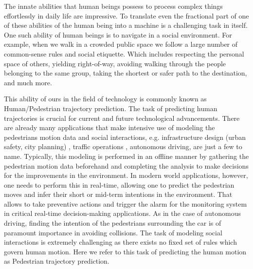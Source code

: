 The innate abilities that human beings possess to process complex things effortlessly in daily life are impressive. To translate even the fractional part of one of these abilities of the human being into a machine is a challenging task in itself. One such ability of human beings is to navigate in a social environment. For example, when we walk in a crowded public space we follow a large number of common-sense rules and social etiquette. Which includes respecting the personal space of others, yielding right-of-way, avoiding walking through the people belonging to the same group, taking the shortest or safer path to the destination, and much more.

This ability of ours in the field of technology is commonly known as Human/Pedestrian trajectory prediction. The task of predicting human trajectories is crucial for current and future technological advancements. There are already many applications that make intensive use of modeling the pedestrians motion data and social interactions, e.g. infrastructure design (urban safety, city planning) \cite{Hanisch2003OnlineSO, Lerner2007CrowdsBE, Bitgood2006AnAO}, traffic operations \cite{Horni2016TheMT}, autonomous driving, are just a few to name. Typically, this modeling is performed in an offline manner by gathering the pedestrian motion data beforehand and completing the analysis to make decisions for the improvements in the environment. In modern world applications, however, one needs to perform this in real-time, allowing one to predict the pedestrian moves and infer their short or mid-term intentions in the environment. That allows to take preventive actions and trigger the alarm for the monitoring system in critical real-time decision-making applications. As in the case of autonomous driving, finding the intention of the pedestrians surrounding the car is of paramount importance in avoiding collisions. The task of modeling social interactions is extremely challenging as there exists no fixed set of rules which govern human motion. Here we refer to this task of predicting the human motion as Pedestrian trajectory prediction.

